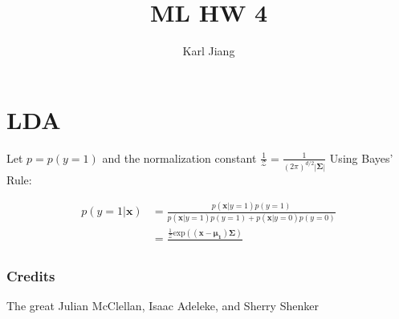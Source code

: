 \documentclass[a4paper,12pt]{article}
\title{ML HW 4}
\author{Karl Jiang}
\begin{document}
\maketitle 

\section{LDA}

Let $p = p(y = 1)$ and the normalization constant 
$\frac{1}{\mathcal{Z}} = \frac{1}{(2\pi)^{d / 2}|{\mathbf{\Sigma}}|}$ Using Bayes' Rule: 

$$
\begin{aligned} 
p(y = 1|\mathbf{x}) &= \frac{p(\mathbf{x}|y = 1) p(y = 1)} 
{p(\mathbf{x}|y = 1) p(y = 1) + p(\mathbf{x}|y = 0) p(y = 0)} \\ 
	&= \frac{\frac{1}{\mathcal{Z}} \textrm{exp}(\mathbf{(x - \mu_1)\Sigma}) }
	{}  
\end{aligned} 
$$


\subsubsection{Credits} 

The great Julian McClellan, Isaac Adeleke, and Sherry Shenker  
\end{document}
